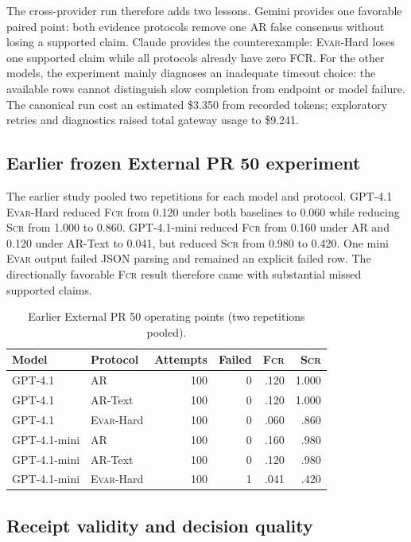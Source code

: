 \documentclass[acmsmall,screen,review,anonymous]{acmart}
\newcommand{\evar}{\textsc{Evar}\xspace}
\newcommand{\fcr}{\textsc{Fcr}\xspace}
\newcommand{\scr}{\textsc{Scr}\xspace}
\begin{document}
The cross-provider run therefore adds two lessons. Gemini provides one favorable paired point: both evidence protocols remove one AR false consensus without losing a supported claim. Claude provides the counterexample: \evar-Hard loses one supported claim while all protocols already have zero FCR. For the other models, the experiment mainly diagnoses an inadequate timeout choice: the available rows cannot distinguish slow completion from endpoint or model failure. The canonical run cost an estimated \$3.350 from recorded tokens; exploratory retries and diagnostics raised total gateway usage to \$9.241.

\subsection{Earlier frozen External PR 50 experiment}

The earlier study pooled two repetitions for each model and protocol. GPT-4.1 \evar-Hard reduced \fcr from 0.120 under both baselines to 0.060 while reducing \scr from 1.000 to 0.860. GPT-4.1-mini reduced \fcr from 0.160 under AR and 0.120 under AR-Text to 0.041, but reduced \scr from 0.980 to 0.420. One mini \evar output failed JSON parsing and remained an explicit failed row. The directionally favorable \fcr result therefore came with substantial missed supported claims.

\begin{table}[h]
\centering
\caption{Earlier External PR 50 operating points (two repetitions pooled).}
\label{tab:external}
\small
\begin{tabular}{@{}llrrrr@{}}
\toprule
Model & Protocol & Attempts & Failed & \fcr & \scr \\
\midrule
GPT-4.1 & AR & 100 & 0 & .120 & 1.000 \\
GPT-4.1 & AR-Text & 100 & 0 & .120 & 1.000 \\
GPT-4.1 & \evar-Hard & 100 & 0 & .060 & .860 \\
GPT-4.1-mini & AR & 100 & 0 & .160 & .980 \\
GPT-4.1-mini & AR-Text & 100 & 0 & .120 & .980 \\
GPT-4.1-mini & \evar-Hard & 100 & 1 & .041 & .420 \\
\bottomrule
\end{tabular}
\end{table}

\subsection{Receipt validity and decision quality}
\end{document}
